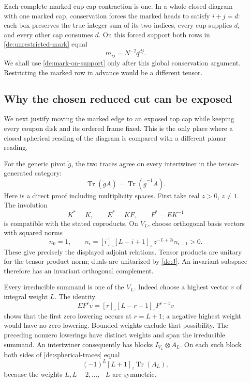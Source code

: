 Each complete marked cup-cap contraction is one. In a whole
closed diagram with one marked cap, conservation forces the
marked heads to satisfy \(i+j=d\): each box preserves the true
integer sum of its two indices, every cup supplies \(d\), and
every other cap consumes \(d\). On this forced support both
rows in \eqref{de:unrestricted-mark} equal
\begin{equation}\label{de:mark-on-support}
                         m_{ij}=N^{-2}q^{dj}.
\end{equation}
We shall use \eqref{de:mark-on-support} only after this global
conservation argument. Restricting the marked row in advance
would be a different tensor.

\subsection{Why the chosen reduced cut can be exposed}

We next justify moving the marked edge to an exposed top cap
while keeping every coupon disk and its ordered frame fixed.
This is the only place where a closed spherical reading of the
diagram is compared with a different planar reading.

For the generic pivot \(\widetilde g\), the two traces agree on
every intertwiner in the tensor-generated category:
\begin{equation}\label{de:spherical-traces}
 \operatorname{Tr}(\widetilde gA)
       =\operatorname{Tr}(\widetilde g^{-1}A).
\end{equation}
Here is a direct proof including multiplicity spaces. First take
real \(z>0\), \(z\ne1\). The involution
\[
                  K^*=K,\qquad E^*=KF,\qquad F^*=EK^{-1}
\]
is compatible with the stated coproducts. On \(V_L\), choose
orthogonal basis vectors with squared norms
\[
 n_0=1,\qquad
 n_i=[i]_z[L-i+1]_z\,z^{-L+2i}n_{i-1}>0.
\]
These give precisely the displayed adjoint relations. Tensor
products are unitary for the tensor-product norm; duals are
unitarized by \eqref{de:J}. An invariant subspace therefore has
an invariant orthogonal complement.

Every irreducible summand is one of the \(V_L\). Indeed choose a
highest vector \(v\) of integral weight \(L\). The identity
\[
 EF^rv=[r]_z[L-r+1]_zF^{r-1}v
\]
shows that the first zero lowering occurs at \(r=L+1\); a
negative highest weight would have no zero lowering. Bounded
weights exclude that possibility. The preceding nonzero
lowerings have distinct weights and span the irreducible
summand. An intertwiner consequently has blocks
\(I_{V_L}\otimes A_L\). On each such block both sides of
\eqref{de:spherical-traces} equal
\[
                         (-1)^L[L+1]_z\operatorname{Tr}(A_L),
\]
because the weights \(L,L-2,\ldots,-L\) are symmetric.

